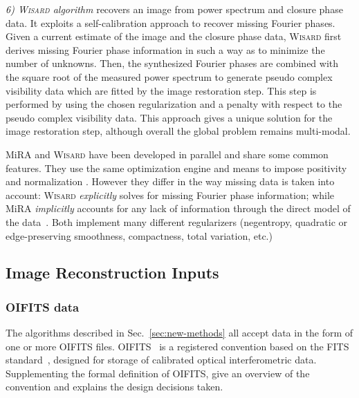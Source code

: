 \documentclass{article}
\newcommand{\etc}{etc.\xspace}
\newcommand{\Mira}{MiRA\xspace}
\newcommand{\Wisard}{\textsc{Wisard}\xspace}
\newcommand{\OIFITS}{OIFITS\xspace} %
\begin{document}
\textit{6) \Wisard algorithm} \citep{Meimon_et_al-2005-weak_phase_imaging}
recovers an image from power spectrum and closure phase data.  It exploits a
self-calibration approach
\citep{Readhead_Wilkinson-1978-VLBI,Cornwell_Wilkinson-1981-self_calibration}
to recover missing Fourier phases.  Given a current estimate of the image and
the closure phase data, \Wisard first derives missing Fourier phase
information in such a way as to minimize the number of unknowns.  Then, the
synthesized Fourier phases are combined with the square root of the measured
power spectrum to generate pseudo complex visibility data which are fitted by
the image restoration step.  This step is performed by using the chosen
regularization and a penalty with respect to the pseudo complex visibility
data. This approach gives a unique solution for the image restoration step,
although overall the global problem remains multi-modal.

\Mira and \Wisard have been developed in parallel and share some common
features.  They use the same optimization engine
\citep{Thiebaut:spie2002:bdec} and means to impose positivity and
normalization \citep{LeBesnerais_et_al-2008-interferometry}.  However they
differ in the way missing data is taken into account: \Wisard
\emph{explicitly} solves for missing Fourier phase information; while \Mira
\emph{implicitly} accounts for any lack of information through the direct
model of the data~\citep{LeBesnerais_et_al-2008-interferometry}. Both implement
many different regularizers (negentropy, quadratic or edge-preserving
smoothness, compactness, total variation, \etc)

\subsection{Image Reconstruction Inputs}
\label{sec:inputs}

\subsubsection{\OIFITS data}

The algorithms described in Sec.~\ref{sec:new-methods} all accept data in the
form of one or more \OIFITS files. \OIFITS~\citep{Pauls_et_al-2005-oifits} is
a registered convention based on the FITS
standard~\citep{Hanisch_et_al-2001-fits}, designed for storage of calibrated
optical interferometric data. Supplementing the formal definition of \OIFITS,
\citet{Pauls_et_al-2004-oifits-spie} give an overview of the convention and
explains the design decisions taken.
\end{document}
